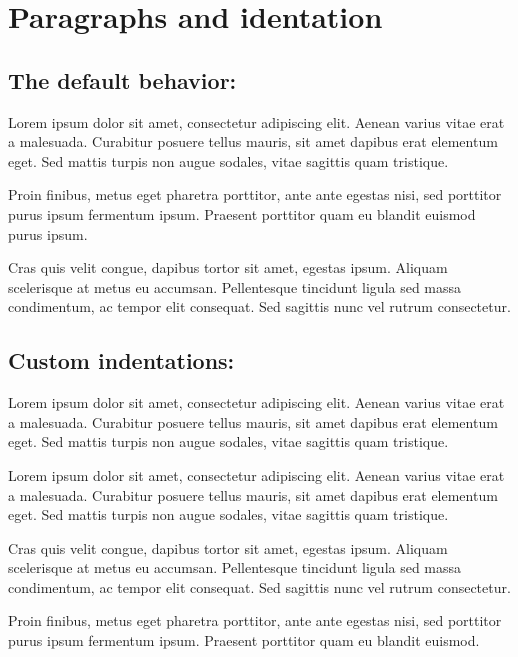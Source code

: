 \documentclass{article}
\begin{document}
\section*{Paragraphs and identation}

\subsection*{The default behavior:}

Lorem ipsum dolor sit amet, consectetur adipiscing elit. Aenean varius
vitae erat a malesuada. Curabitur posuere tellus mauris, sit amet dapibus erat
elementum eget. Sed mattis turpis non augue sodales, vitae sagittis quam
tristique.

Proin finibus, metus eget pharetra porttitor, ante ante egestas
nisi, sed porttitor purus ipsum fermentum ipsum. Praesent porttitor quam eu
blandit euismod purus ipsum.

Cras quis velit congue, dapibus tortor sit amet, egestas ipsum.
Aliquam scelerisque at metus eu accumsan. Pellentesque tincidunt ligula sed
massa condimentum, ac tempor elit consequat. Sed sagittis nunc vel rutrum
consectetur.

\subsection*{Custom indentations:}

\noindent Lorem ipsum dolor sit amet, consectetur adipiscing elit. Aenean varius
vitae erat a malesuada. Curabitur posuere tellus mauris, sit amet dapibus erat
elementum eget. Sed mattis turpis non augue sodales, vitae sagittis quam
tristique.

\bigskip

\noindent Lorem ipsum dolor sit amet, consectetur adipiscing elit. Aenean varius
vitae erat a malesuada. Curabitur posuere tellus mauris, sit amet dapibus erat
elementum eget. Sed mattis turpis non augue sodales, vitae sagittis quam
tristique.

\setlength{\parindent}{0em}
\setlength{\parskip}{2em}

Cras quis velit congue, dapibus tortor sit amet, egestas ipsum.
Aliquam scelerisque at metus eu accumsan. Pellentesque tincidunt ligula sed
massa condimentum, ac tempor elit consequat. Sed sagittis nunc vel rutrum
consectetur.

\setlength{\parskip}{4em} %

Proin finibus, metus eget pharetra porttitor, ante ante egestas
nisi, sed porttitor purus ipsum fermentum ipsum. Praesent porttitor quam eu
blandit euismod.
\end{document}
